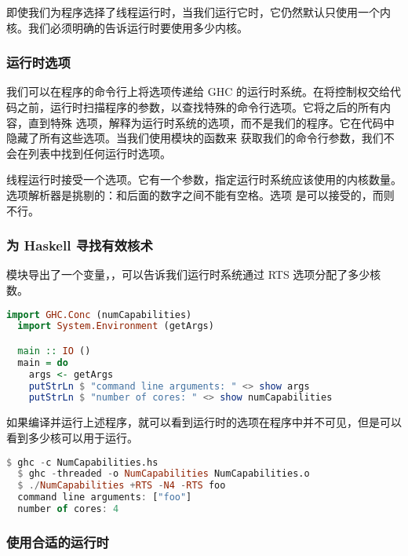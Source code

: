 \documentclass[./main.tex]{subfiles}
\begin{document}
即使我们为程序选择了线程运行时，当我们运行它时，它仍然默认只使用一个内核。我们必须明确的告诉运行时要使用多少内核。

\subsubsection*{运行时选项}

我们可以在程序的命令行上将选项传递给 GHC 的运行时系统。在将控制权交给代码之前，运行时扫描程序的参数，以查找特殊的命令行选项。它将之后的所有内容，直到特殊
选项，解释为运行时系统的选项，而不是我们的程序。它在代码中隐藏了所有这些选项。当我们使用模块的函数来
获取我们的命令行参数，我们不会在列表中找到任何运行时选项。

线程运行时接受一个选项。它有一个参数，指定运行时系统应该使用的内核数量。选项解析器是挑剔的：和后面的数字之间不能有空格。选项
是可以接受的，而则不行。

\subsubsection*{为 Haskell 寻找有效核术}

模块导出了一个变量，，可以告诉我们运行时系统通过 RTS 选项分配了多少核数。

\begin{lstlisting}[language=Haskell]
  import GHC.Conc (numCapabilities)
  import System.Environment (getArgs)

  main :: IO ()
  main = do
    args <- getArgs
    putStrLn $ "command line arguments: " <> show args
    putStrLn $ "number of cores: " <> show numCapabilities
\end{lstlisting}

如果编译并运行上述程序，就可以看到运行时的选项在程序中并不可见，但是可以看到多少核可以用于运行。

\begin{lstlisting}[language=Haskell]
  $ ghc -c NumCapabilities.hs
  $ ghc -threaded -o NumCapabilities NumCapabilities.o
  $ ./NumCapabilities +RTS -N4 -RTS foo
  command line arguments: ["foo"]
  number of cores: 4
\end{lstlisting}

\subsubsection*{使用合适的运行时}
\end{document}
